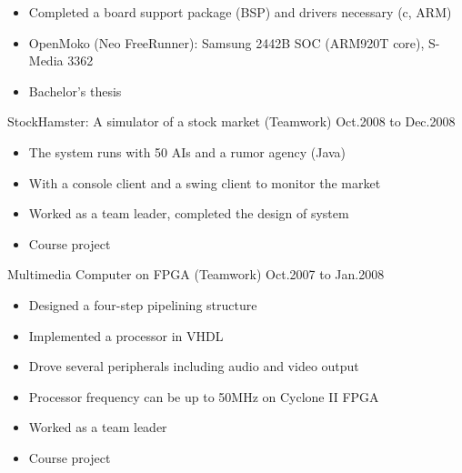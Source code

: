 \documentclass[11pt]{res} %
\begin{document}
\begin{resume}
\begin{itemize} \itemsep -2pt
\item Completed a board support package (BSP) and drivers necessary (c, ARM)
\item OpenMoko (Neo FreeRunner): Samsung 2442B SOC (ARM920T core), S-Media 3362
\item Bachelor's thesis
\end{itemize}

StockHamster: A simulator of a stock market (Teamwork) \hfill Oct.2008 to Dec.2008

\begin{itemize} \itemsep -2pt
\item The system runs with 50 AIs and a rumor agency (Java)
\item With a console client and a swing client to monitor the market
\item Worked as a team leader, completed the design of system
\item Course project
\end{itemize}

Multimedia Computer on FPGA (Teamwork) \hfill Oct.2007 to Jan.2008

\begin{itemize} \itemsep -2pt
\item Designed a four-step pipelining structure
\item Implemented a processor in VHDL
\item Drove several peripherals including audio and video output
\item Processor frequency can be up to 50MHz on Cyclone II FPGA
\item Worked as a team leader
\item Course project
\end{itemize}




\end{resume}
\end{document}
